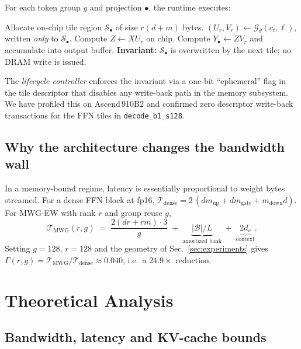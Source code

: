 \documentclass[11pt]{article}
\theoremstyle{definition}
\newcommand{\trafficop}{\mathcal{T}}
\begin{document}
For each token group $g$ and projection $\bullet$, the runtime executes:
\begin{algorithm}[H]
\caption{MWG-EW associative tile execution (no write-back).}
\label{alg:lifecycle}
\begin{algorithmic}[1]
\STATE Allocate on-chip tile region $\mathcal{S}_\bullet$ of size $r(d{+}m)$ bytes.
\STATE $(U_r,V_r) \leftarrow \mathcal{G}_\theta(c_t,\ell)$, written \emph{only} to $\mathcal{S}_\bullet$.
\STATE Compute $Z \leftarrow X U_r$ on chip.
\STATE Compute $Y_\bullet \leftarrow Z V_r$ and accumulate into output buffer.
\STATE \textbf{Invariant:} $\mathcal{S}_\bullet$ is overwritten by the next tile; no DRAM write is issued.
\end{algorithmic}
\end{algorithm}
The \emph{lifecycle controller} enforces the invariant via a one-bit ``ephemeral'' flag in the tile descriptor that disables any write-back path in the memory subsystem. We have profiled this on Ascend\,910B2 and confirmed zero descriptor write-back transactions for the FFN tiles in \texttt{decode\_b1\_s128}.

\subsection{Why the architecture changes the bandwidth wall}

In a memory-bound regime, latency is essentially proportional to weight bytes streamed. For a dense FFN block at fp16,
\(
\trafficop_{\text{dense}} = 2\,(d m_{\text{up}} + d m_{\text{gate}} + m_{\text{down}} d).
\)
For MWG-EW with rank $r$ and group reuse $g$,
\begin{equation}
\trafficop_{\text{MWG}}(r,g) \;=\; \frac{2(dr{+}rm)\cdot 3}{g} \;+\; \underbrace{|\mathcal{B}|/L}_{\text{amortized bank}} \;+\; \underbrace{2 d_c}_{\text{context}}.
\label{eq:traffic}
\end{equation}
Setting $g{=}128$, $r{=}128$ and the geometry of Sec.~\ref{sec:experiments} gives $\Gamma(r,g)=\trafficop_{\text{MWG}}/\trafficop_{\text{dense}} \approx 0.040$, i.e.\ a $24.9\times$ reduction.

\section{Theoretical Analysis}
\label{sec:theory}

\subsection{Bandwidth, latency and KV-cache bounds}
\end{document}
